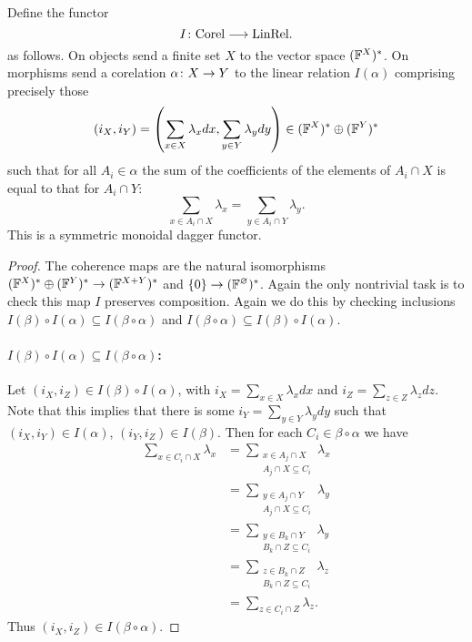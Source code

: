 \begin{proposition}
  Define the functor
  \[
    I{\colon} \mathrm{Corel} \longrightarrow \mathrm{LinRel}.
  \]
  as follows. On objects send a finite set $X$ to the vector space
  $({\mathbb F}^{X})^\ast$. On morphisms send a corelation $\alpha{\colon} X \to Y$
  to the linear relation $I(\alpha)$ comprising precisely those 
  \[
    (i_X,i_Y) = \left(\sum_{x \in X} \lambda_xdx,\sum_{y \in Y}
    \lambda_ydy\right)  \in ({\mathbb F}^{X})^\ast \oplus ({\mathbb F}^{Y})^\ast
  \]
  such that for all $A_i \in \alpha$ the sum of the coefficients of the elements
  of $A_i \cap X$ is equal to that for $A_i \cap Y$:
  \[
    \sum_{x \in A_i \cap X} \lambda_x = \sum_{y \in A_i \cap Y} \lambda_y.
  \]
  This is a symmetric monoidal dagger functor.
\end{proposition}
\begin{proof}
The coherence maps are the natural isomorphisms $({\mathbb F}^X)^\ast \oplus ({\mathbb F}^Y)^\ast
\to ({\mathbb F}^{X+Y})^\ast$ and $\{0\} \to ({\mathbb F}^\varnothing)^\ast$. Again the only
nontrivial task is to check this map $I$ preserves composition. Again we do this
by checking inclusions $I(\beta) \circ I(\alpha) \subseteq I(\beta\circ\alpha)$
and $I(\beta\circ\alpha) \subseteq I(\beta) \circ I(\alpha)$. 

\paragraph{$I(\beta) \circ I(\alpha) \subseteq I(\beta\circ\alpha)$:} Let
$(i_X,i_Z) \in I(\beta)\circ I(\alpha)$, with $i_X = \sum_{x \in X} \lambda_x dx$
and $i_Z = \sum_{z \in Z} \lambda_z dz$. Note that this implies that there is
some $i_Y = \sum_{y \in Y} \lambda_y dy$ such that $(i_X,i_Y) \in I(\alpha)$,
$(i_Y,i_Z) \in I(\beta)$. Then for each $C_i \in \beta\circ\alpha$ we have
\begin{align*}
  \sum_{x \in C_i \cap X} \lambda_x
  &= \sum_{\substack{x \in A_j \cap X \\ A_j \cap X \subseteq C_i}}
  \lambda_x \\
  &= \sum_{\substack{y \in A_j \cap Y \\ A_j \cap X \subseteq C_i}}
  \lambda_y \tag{By definition of $I(\alpha)$}\\
  &= \sum_{\substack{y \in B_k \cap Y \\ B_k \cap Z \subseteq C_i}}
  \lambda_y \tag{See composition of corelations}\\
  &= \sum_{\substack{z \in B_k \cap Z \\ B_k \cap Z \subseteq C_i}}
  \lambda_z \tag{By definition of $I(\beta)$} \\
  &= \sum_{z \in C_i \cap Z} \lambda_z. 
\end{align*}
Thus $(i_X,i_Z) \in I(\beta\circ\alpha)$.


\end{proof}
